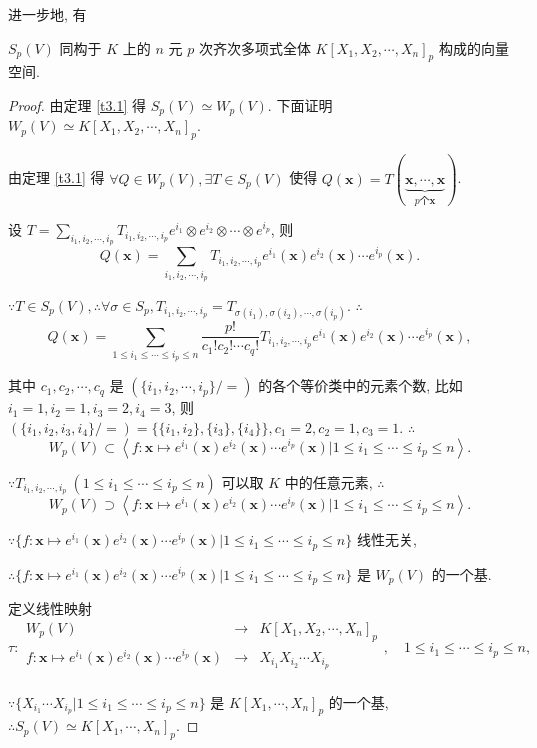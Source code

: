 \documentclass[color=black,device=normal,lang=cn,mode=geye]{elegantnote}
\begin{document}
进一步地, 有
\begin{theorem}\label{t3.2}
    $S_p(V)$ 同构于 $K$ 上的 $n$ 元 $p$ 次齐次多项式全体 $K[X_1,X_2,\cdots,X_n]_p$ 构成的向量空间.
\end{theorem}
\begin{proof}
    由定理 \ref{t3.1} 得 $S_p(V)\simeq W_p(V)$. 下面证明 $W_p(V)\simeq K[X_1,X_2,\cdots,X_n]_p$.

    由定理 \ref{t3.1} 得 $\forall Q\in W_p(V),\exists T\in S_p(V)$ 使得 $Q(\boldsymbol{x})=T(\underbrace{\boldsymbol{x},\cdots,\boldsymbol{x}}_{p\text{个}\boldsymbol{x}})$.

    设 $T=\sum\limits_{i_1,i_2,\cdots,i_p}T_{i_1,i_2,\cdots,i_p}e^{i_1}\otimes e^{i_2}\otimes\cdots\otimes e^{i_p}$, 则
    \[Q(\boldsymbol{x})=\sum\limits_{i_1,i_2,\cdots,i_p}T_{i_1,i_2,\cdots,i_p}e^{i_1}(\boldsymbol{x})e^{i_2}(\boldsymbol{x})\cdots e^{i_p}(\boldsymbol{x}).\]

    $\because T\in S_p(V),\therefore\forall\sigma\in S_p,T_{i_1,i_2,\cdots,i_p}=T_{\sigma(i_1),\sigma(i_2),\cdots,\sigma(i_p)}$. $\therefore$
    \[Q(\boldsymbol{x})=\sum\limits_{1\leq i_1\leq\cdots\leq i_p\leq n}\dfrac{p!}{c_1!c_2!\cdots c_q!}T_{i_1,i_2,\cdots,i_p}e^{i_1}(\boldsymbol{x})e^{i_2}(\boldsymbol{x})\cdots e^{i_p}(\boldsymbol{x}),\]

    其中 $c_1,c_2,\cdots,c_q$ 是 $(\{i_1,i_2,\cdots,i_p\}/=)$ 的各个等价类中的元素个数, 比如 $i_1=1,i_2=1,i_3=2,i_4=3$, 则 $(\{i_1,i_2,i_3,i_4\}/=)=\{\{i_1,i_2\},\{i_3\},\{i_4\}\},c_1=2,c_2=1,c_3=1$. $\therefore$
    \[W_p(V)\subset\left<f:\boldsymbol{x}\mapsto e^{i_1}(\boldsymbol{x})e^{i_2}(\boldsymbol{x})\cdots e^{i_p}(\boldsymbol{x})|1\leq i_1\leq\cdots\leq i_p\leq n\right>.\]

    $\because T_{i_1,i_2,\cdots,i_p}\ (1\leq i_1\leq\cdots\leq i_p\leq n)$ 可以取 $K$ 中的任意元素, $\therefore$
    \[W_p(V)\supset\left<f:\boldsymbol{x}\mapsto e^{i_1}(\boldsymbol{x})e^{i_2}(\boldsymbol{x})\cdots e^{i_p}(\boldsymbol{x})|1\leq i_1\leq\cdots\leq i_p\leq n\right>.\]

    $\because\{f:\boldsymbol{x}\mapsto e^{i_1}(\boldsymbol{x})e^{i_2}(\boldsymbol{x})\cdots e^{i_p}(\boldsymbol{x})|1\leq i_1\leq\cdots\leq i_p\leq n\}$ 线性无关,
    
    $\therefore\{f:\boldsymbol{x}\mapsto e^{i_1}(\boldsymbol{x})e^{i_2}(\boldsymbol{x})\cdots e^{i_p}(\boldsymbol{x})|1\leq i_1\leq\cdots\leq i_p\leq n\}$ 是 $W_p(V)$ 的一个基.

    定义线性映射
    \[\tau:\begin{array}{rcl}
        W_p(V) & \rightarrow & K[X_1,X_2,\cdots,X_n]_p \\
        f:\boldsymbol{x}\mapsto e^{i_1}(\boldsymbol{x})e^{i_2}(\boldsymbol{x})\cdots e^{i_p}(\boldsymbol{x}) & \rightarrow & X_{i_1}X_{i_2}\cdots X_{i_p} \\
    \end{array},\quad1\leq i_1\leq\cdots\leq i_p\leq n,\]

    $\because\{X_{i_1}\cdots X_{i_p}|1\leq i_1\leq\cdots\leq i_p\leq n\}$ 是 $K[X_1,\cdots,X_n]_p$ 的一个基, $\therefore S_p(V)\simeq K[X_1,\cdots,X_n]_p$.
\end{proof}
\end{document}
